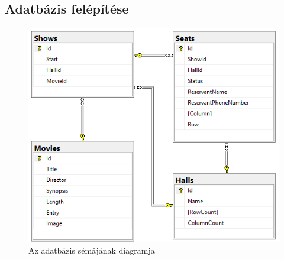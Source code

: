 \documentclass{article}
\begin{document}
	\subsection*{Adatbázis felépítése}
	\begin{figure}[H]
		\centering
				\includegraphics[width=\textwidth]{database}
		\caption{Az adatbázis sémájának diagramja}
	\end{figure}
\end{document}
